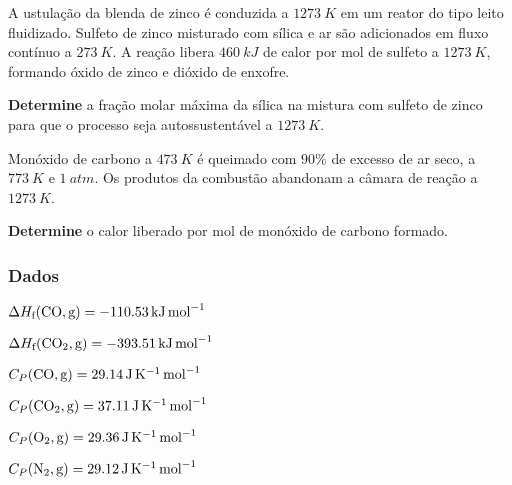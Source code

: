 \documentclass[braun, twocolumn]{braun}
\begin{document}
\begin{problem}
[2A48]A ustulação da blenda de zinco é conduzida a \(\qty{1273}{K}\) em um
reator do tipo leito fluidizado. Sulfeto de zinco misturado com sílica e
ar são adicionados em fluxo contínuo a \(\qty{273}{K}\). A reação libera
\(\qty{460}{kJ}\) de calor por mol de sulfeto a \(\qty{1273}{K}\), formando
óxido de zinco e dióxido de enxofre.

\textbf{Determine} a fração molar máxima da sílica na mistura com
sulfeto de zinco para que o processo seja autossustentável a
\(\qty{1273}{K}\).

\end{problem}



\begin{problem}
[2A49]Monóxido de carbono a \(\qty{473}{K}\) é queimado com \(90\%\) de excesso
de ar seco, a \(\qty{773}{K}\) e \(\qty{1}{atm}\). Os produtos da combustão
abandonam a câmara de reação a \(\qty{1273}{K}\).

\textbf{Determine} o calor liberado por mol de monóxido de carbono
formado.
\subsubsection*{Dados}


\begin{datalist}

\item $\Delta H_\text{f}(\ce{CO, {g}}) = \qty{-110,53}{kJ.mol^{-1}}$
\item $\Delta H_\text{f}(\ce{CO2, {g}}) = \qty{-393,51}{kJ.mol^{-1}}$
\item $C_P(\ce{CO, {g}}) = \qty{29,14}{J.K^{-1}.mol^{-1}}$
\item $C_P(\ce{CO2, {g}}) = \qty{37,11}{J.K^{-1}.mol^{-1}}$
\item $C_P(\ce{O2, {g}}) = \qty{29,36}{J.K^{-1}.mol^{-1}}$
\item $C_P(\ce{N2, {g}}) = \qty{29,12}{J.K^{-1}.mol^{-1}}$
\end{datalist}

\end{problem}
\end{document}
